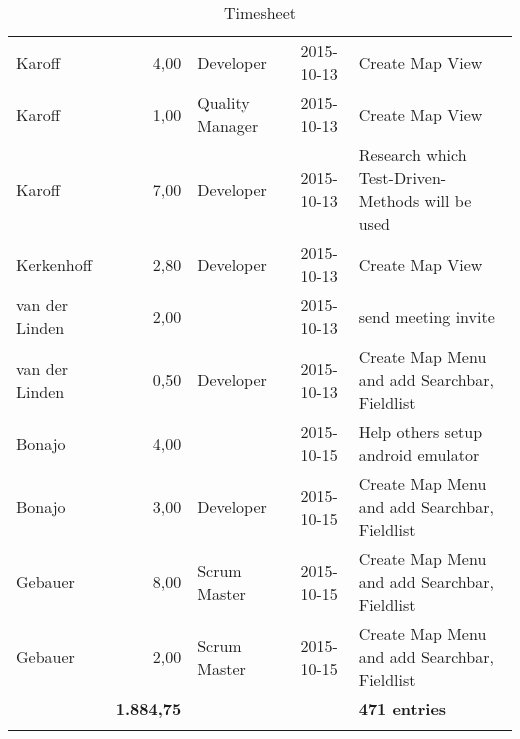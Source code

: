 \begin{longtable}{ l r p{2cm} c p{4cm}}
		\hline
		Karoff                  & 4,00           & Developer       & 2015-10-13    & Create Map View                                 \\
		Karoff                  & 1,00           & Quality Manager & 2015-10-13    & Create Map View                                 \\
		Karoff                  & 7,00           & Developer       & 2015-10-13    & Research which Test-Driven-Methods will be used \\
		Kerkenhoff              & 2,80           & Developer       & 2015-10-13    & Create Map View                                 \\
		van der Linden          & 2,00           &                 & 2015-10-13    & send meeting invite                             \\
		van der Linden          & 0,50           & Developer       & 2015-10-13    & Create Map Menu and add Searchbar, Fieldlist    \\
		Bonajo                  & 4,00           &                 & 2015-10-15    & Help others setup android emulator              \\
		Bonajo                  & 3,00           & Developer       & 2015-10-15    & Create Map Menu and add Searchbar, Fieldlist    \\
		Gebauer                 & 8,00           & Scrum Master    & 2015-10-15    & Create Map Menu and add Searchbar, Fieldlist    \\
		Gebauer                 & 2,00           & Scrum Master    & 2015-10-15    & Create Map Menu and add Searchbar, Fieldlist    \\
		\hline
		 & \textbf{1.884,75} &  &  & \textbf{471 entries} \\
		\caption{Timesheet\label{tab:timesheet}}
	\end{longtable}